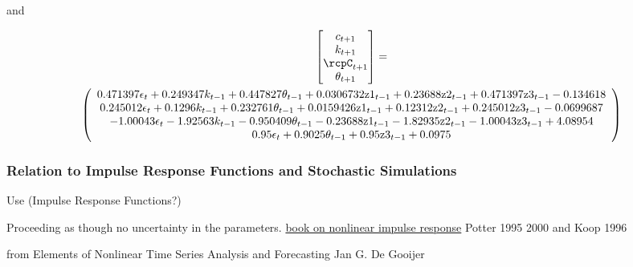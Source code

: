 \documentclass[12pt]{article}
\begin{document}
and 


{\tiny
\begin{gather}
  \begin{bmatrix}
c_{t+1}\\k_{t+1}\\ \rcpC_{t+1}\\\theta_{t+1}
  \end{bmatrix}=\\%
  \left(
   \begin{array}{c}
 0.471397 \epsilon _t+0.249347 k_{t-1}+0.447827 \theta _{t-1}+0.0306732
   \text{z1}_{t-1}+0.23688 \text{z2}_{t-1}+0.471397 \text{z3}_{t-1}-0.134618 \\
 0.245012 \epsilon_t+0.1296 k_{t-1}+0.232761 \theta _{t-1}+0.0159426
   \text{z1}_{t-1}+0.12312 \text{z2}_{t-1}+0.245012 \text{z3}_{t-1}-0.0699687 \\
 -1.00043 \epsilon _t-1.92563 k_{t-1}-0.950409 \theta _{t-1}-0.23688
   \text{z1}_{t-1}-1.82935 \text{z2}_{t-1}-1.00043 \text{z3}_{t-1}+4.08954 \\
 0.95 \epsilon _t+0.9025 \theta _{t-1}+0.95 \text{z3}_{t-1}+0.0975 \\
   \end{array}
   \right)
\end{gather}}




\subsubsection{Relation to Impulse Response Functions and Stochastic Simulations}
\label{sec:relImp}


Use (Impulse Response Functions?)

Proceeding as though no uncertainty in the parameters.
\href{https://books.google.co.uk/books?id=kLiRDgAAQBAJ&pg=PA77&lpg=PA77&dq=nonlinear+models+impulse+response+function+conditional+expectations&source=bl&ots=1pCjlcgxSu&sig=WA9INrvXVcFhVOd_2wq8-V6alw8&hl=en&sa=X&ved=0ahUKEwid1Y3fvuPWAhUlKsAKHT7lCDkQ6AEITjAF#v=onepage&q=nonlinear%20models%20impulse%20response%20function%20conditional%20expectations&f=false}{book on nonlinear impulse response}
  Potter 1995 2000 and Koop 1996

  from  Elements of Nonlinear Time Series Analysis and Forecasting  Jan G. De Gooijer
\end{document}
